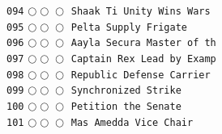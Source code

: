 \documentclass[a4paper,landscape]{article}
\begin{document}
\begin{multicols*}{5}
\texttt{094} \(\bigcirc\!\bigcirc\!\bigcirc\)  \texttt{Shaak Ti Unity Wins Wars} \vspace{-0.3mm}\\ 
\texttt{095} \(\bigcirc\!\bigcirc\!\bigcirc\)  \texttt{Pelta Supply Frigate} \vspace{-0.3mm}\\ 
\texttt{096} \(\bigcirc\!\bigcirc\!\bigcirc\)  \texttt{Aayla Secura Master of th} \vspace{-0.3mm}\\ 
\texttt{097} \(\bigcirc\!\bigcirc\!\bigcirc\)  \texttt{Captain Rex Lead by Examp} \vspace{-0.3mm}\\ 
\texttt{098} \(\bigcirc\!\bigcirc\!\bigcirc\)  \texttt{Republic Defense Carrier} \vspace{-0.3mm}\\ 
\texttt{099} \(\bigcirc\!\bigcirc\!\bigcirc\)  \texttt{Synchronized Strike} \vspace{-0.3mm}\\ 
\texttt{100} \(\bigcirc\!\bigcirc\!\bigcirc\)  \texttt{Petition the Senate} \vspace{-0.3mm}\\ 
\texttt{101} \(\bigcirc\!\bigcirc\!\bigcirc\)  \texttt{Mas Amedda Vice Chair} \vspace{-0.3mm}\\ 

\end{multicols*}
\end{document}
